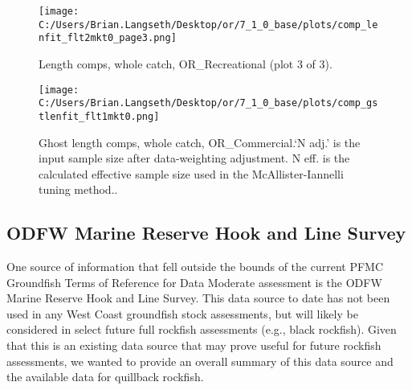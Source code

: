 \documentclass[11pt,
  english,
  a4paper,
]{article}
\begin{document}
\tagmcend\tagstructend


\begin{figure}
\centering
\texttt{[image: C:/Users/Brian.Langseth/Desktop/or/7\_1\_0\_base/plots/comp\_lenfit\_flt2mkt0\_page3.png]}
\caption{Length comps, whole catch, OR\_Recreational (plot 3 of 3).\label{fig:comp_lenfit_flt2mkt0_page3}}
\end{figure}

\tagmcend\tagstructend


\begin{figure}
\centering
\texttt{[image: C:/Users/Brian.Langseth/Desktop/or/7\_1\_0\_base/plots/comp\_gstlenfit\_flt1mkt0.png]}
\caption{Ghost length comps, whole catch, OR\_Commercial.`N adj.' is the input sample size after data-weighting adjustment. N eff. is the calculated effective sample size used in the McAllister-Iannelli tuning method..\label{fig:comp_gstlenfit_flt1mkt0}}
\end{figure}

\tagmcend\tagstructend

\clearpage


\hypertarget{odfw-marine-reserve-hook-and-line-survey}{%
\subsection{ODFW Marine Reserve Hook and Line Survey}\label{odfw-marine-reserve-hook-and-line-survey}}

\leavevmode\tagmcend\tagstructend


One source of information that fell outside the bounds of the current PFMC Groundfish Terms of Reference for Data Moderate assessment is the ODFW Marine Reserve Hook and Line Survey. This data source to date has not been used in any West Coast groundfish stock assessments, but will likely be considered in select future full rockfish assessments (e.g., black rockfish). Given that this is an existing data source that may prove useful for future rockfish assessments, we wanted to provide an overall summary of this data source and the available data for quillback rockfish.
\end{document}
